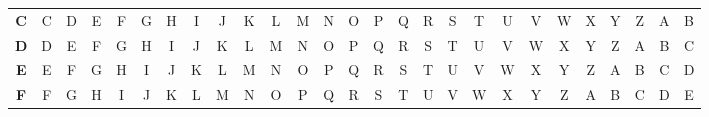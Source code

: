 \documentclass{article}
\begin{document}
\begin{latin}
\begin{table}[H]
{\begin{tabular}{ccccccccccccccccccccccccccc}
\multicolumn{1}{c|}{\textbf{C}} & \multicolumn{1}{c|}{C} & \multicolumn{1}{c|}{D} & \multicolumn{1}{c|}{E} & \multicolumn{1}{c|}{F} & \multicolumn{1}{c|}{G} & \multicolumn{1}{c|}{H} & \multicolumn{1}{c|}{I} & \multicolumn{1}{c|}{J} & \multicolumn{1}{c|}{K} & \multicolumn{1}{c|}{L} & \multicolumn{1}{c|}{M} & \multicolumn{1}{c|}{N} & \multicolumn{1}{c|}{O} & \multicolumn{1}{c|}{P} & \multicolumn{1}{c|}{Q} & \multicolumn{1}{c|}{R} & \multicolumn{1}{c|}{S} & \multicolumn{1}{c|}{T} & \multicolumn{1}{c|}{U} & \multicolumn{1}{c|}{V} & \multicolumn{1}{c|}{W} & \multicolumn{1}{c|}{X} & \multicolumn{1}{c|}{Y} & \multicolumn{1}{c|}{Z} & \multicolumn{1}{c|}{A} & \multicolumn{1}{c|}{B} \\ \cline{2-27} 
\multicolumn{1}{c|}{\textbf{D}} & \multicolumn{1}{c|}{D} & \multicolumn{1}{c|}{E} & \multicolumn{1}{c|}{F} & \multicolumn{1}{c|}{G} & \multicolumn{1}{c|}{H} & \multicolumn{1}{c|}{I} & \multicolumn{1}{c|}{J} & \multicolumn{1}{c|}{K} & \multicolumn{1}{c|}{L} & \multicolumn{1}{c|}{M} & \multicolumn{1}{c|}{N} & \multicolumn{1}{c|}{O} & \multicolumn{1}{c|}{P} & \multicolumn{1}{c|}{Q} & \multicolumn{1}{c|}{R} & \multicolumn{1}{c|}{S} & \multicolumn{1}{c|}{T} & \multicolumn{1}{c|}{U} & \multicolumn{1}{c|}{V} & \multicolumn{1}{c|}{W} & \multicolumn{1}{c|}{X} & \multicolumn{1}{c|}{Y} & \multicolumn{1}{c|}{Z} & \multicolumn{1}{c|}{A} & \multicolumn{1}{c|}{B} & \multicolumn{1}{c|}{C} \\ \cline{2-27} 
\multicolumn{1}{c|}{\textbf{E}} & \multicolumn{1}{c|}{E} & \multicolumn{1}{c|}{F} & \multicolumn{1}{c|}{G} & \multicolumn{1}{c|}{H} & \multicolumn{1}{c|}{I} & \multicolumn{1}{c|}{J} & \multicolumn{1}{c|}{K} & \multicolumn{1}{c|}{L} & \multicolumn{1}{c|}{M} & \multicolumn{1}{c|}{N} & \multicolumn{1}{c|}{O} & \multicolumn{1}{c|}{P} & \multicolumn{1}{c|}{Q} & \multicolumn{1}{c|}{R} & \multicolumn{1}{c|}{S} & \multicolumn{1}{c|}{T} & \multicolumn{1}{c|}{U} & \multicolumn{1}{c|}{V} & \multicolumn{1}{c|}{W} & \multicolumn{1}{c|}{X} & \multicolumn{1}{c|}{Y} & \multicolumn{1}{c|}{Z} & \multicolumn{1}{c|}{A} & \multicolumn{1}{c|}{B} & \multicolumn{1}{c|}{C} & \multicolumn{1}{c|}{D} \\ \cline{2-27} 
\multicolumn{1}{c|}{\textbf{F}} & \multicolumn{1}{c|}{F} & \multicolumn{1}{c|}{G} & \multicolumn{1}{c|}{H} & \multicolumn{1}{c|}{I} & \multicolumn{1}{c|}{J} & \multicolumn{1}{c|}{K} & \multicolumn{1}{c|}{L} & \multicolumn{1}{c|}{M} & \multicolumn{1}{c|}{N} & \multicolumn{1}{c|}{O} & \multicolumn{1}{c|}{P} & \multicolumn{1}{c|}{Q} & \multicolumn{1}{c|}{R} & \multicolumn{1}{c|}{S} & \multicolumn{1}{c|}{T} & \multicolumn{1}{c|}{U} & \multicolumn{1}{c|}{V} & \multicolumn{1}{c|}{W} & \multicolumn{1}{c|}{X} & \multicolumn{1}{c|}{Y} & \multicolumn{1}{c|}{Z} & \multicolumn{1}{c|}{A} & \multicolumn{1}{c|}{B} & \multicolumn{1}{c|}{C} & \multicolumn{1}{c|}{D} & \multicolumn{1}{c|}{E} \\ \cline{2-27} 

\end{tabular}}
\end{table}
\end{latin}
\end{document}
